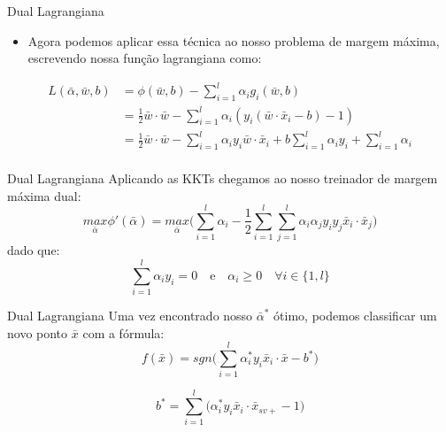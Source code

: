 \documentclass{beamer}
\begin{document}
\begin{frame}{Dual Lagrangiana}
    \begin{itemize}
        \item Agora podemos aplicar essa técnica ao nosso problema de margem máxima, escrevendo nossa função lagrangiana como:
    \end{itemize}
    \begin{equation}
        \begin{split}
            L(\bar{\alpha},\bar{w},b) &=\phi(\bar{w},b) -  \sum_{i=1}^{l}\alpha_i g_i (\bar{w},b) \\
             &=\frac{1}{2}\bar{w}\cdot\bar{w} - \sum_{i=1}^{l}\alpha_i (y_i(\bar{w}\cdot \bar{x}_i -b)-1) \\
             &=\frac{1}{2}\bar{w}\cdot\bar{w} - \sum_{i=1}^{l}\alpha_i y_i \bar{w}\cdot \bar{x}_i + b \sum_{i=1}^{l}\alpha_i y_i + \sum_{i=1}^{l}\alpha_i\\
        \end{split}
    \end{equation}
\end{frame}

\begin{frame}{Dual Lagrangiana}
Aplicando as KKTs chegamos ao nosso treinador de margem máxima dual:
\begin{equation}
    \underset{\bar{\alpha}}{max} \phi' (\bar{\alpha}) = \underset{\bar{\alpha}}{max} \Bigg( \sum_{i=1}^{l}\alpha_i - \frac{1}{2}\sum_{i=1}^{l}\sum_{j=1}^{l}\alpha_i \alpha_j y_i y_j \bar{x}_i\cdot \bar{x}_j \Bigg)
\end{equation}
dado que:
\begin{equation}
    \sum_{i=1}^{l}\alpha_i y_i = 0 \quad \text{e} \quad \alpha_i \ge 0 \quad \forall  i \in \{1,l\}
\end{equation}
\end{frame}

\begin{frame}{Dual Lagrangiana}
Uma vez encontrado nosso $\bar{\alpha}^*$ ótimo, podemos classificar um novo ponto $\bar{x}$ com a fórmula:
\begin{equation}
    f(\bar{x}) = sgn\Bigg(
        \sum_{i=1}^{l} \alpha_i^*y_i\bar{x}_i\cdot\bar{x}
        -b^*
    \Bigg)
\end{equation}

\begin{equation}
    b^* = \sum_{i=1}^{l} 
    \Bigg(
        \alpha_i^*y_i\bar{x}_i\cdot\bar{x}_{sv+} -1
    \Bigg)
\end{equation}
\end{frame}
\end{document}
